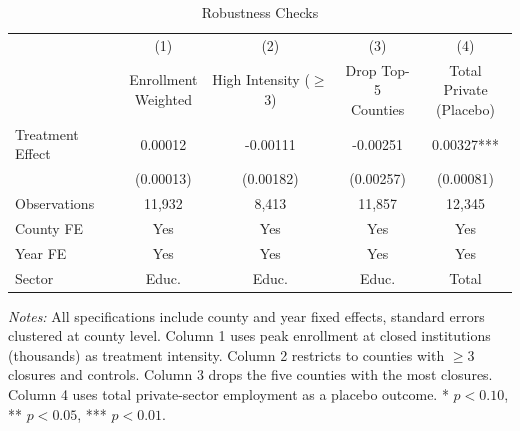 \begin{table}[htbp]
\centering
\caption{Robustness Checks}
\label{tab:robustness}
\begin{tabular}{lcccc}
\hline\hline
 & (1) & (2) & (3) & (4) \\
 & \shortstack{Enrollment\\Weighted} & \shortstack{High Intensity\\($\geq$3)} & \shortstack{Drop Top-5\\Counties} & \shortstack{Total Private\\(Placebo)} \\
\hline
Treatment Effect & 0.00012 & -0.00111 & -0.00251 & 0.00327*** \\
 & (0.00013) & (0.00182) & (0.00257) & (0.00081) \\
\hline
Observations & 11,932 & 8,413 & 11,857 & 12,345 \\
County FE & Yes & Yes & Yes & Yes \\
Year FE & Yes & Yes & Yes & Yes \\
Sector & Educ. & Educ. & Educ. & Total \\
\hline\hline
\end{tabular}
\begin{tablenotes}[flushleft]\small
\item \textit{Notes:} All specifications include county and year fixed effects, standard errors
clustered at county level. Column 1 uses peak enrollment at closed institutions (thousands) as
treatment intensity. Column 2 restricts to counties with $\geq$3 closures and controls.
Column 3 drops the five counties with the most closures. Column 4 uses total private-sector
employment as a placebo outcome.
* $p<0.10$, ** $p<0.05$, *** $p<0.01$.
\end{tablenotes}
\end{table}
